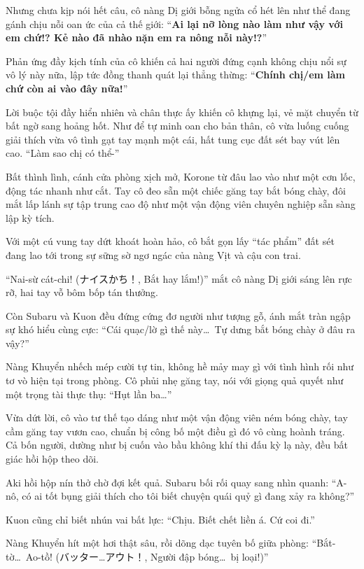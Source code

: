 \documentclass[../main.tex]{subfiles}
\begin{document}
Nhưng chưa kịp nói hết câu, cô nàng Dị giới bỗng ngửa cổ hét lên như thể đang gánh chịu nỗi oan ức của cả thế giới: ``\textbf{Ai lại nỡ lòng nào làm như vậy với em chứ!? Kẻ nào đã nhào nặn em ra nông nỗi này!?}''

Phản ứng đầy kịch tính của cô khiến cả hai người đứng cạnh không chịu nổi sự vô lý này nữa, lập tức đồng thanh quát lại thẳng thừng: ``\textbf{Chính chị/em làm chứ còn ai vào đây nữa!}''

Lời buộc tội đầy hiển nhiên và chân thực ấy khiến cô khựng lại, vẻ mặt chuyển từ bất ngờ sang hoảng hốt. Như để tự minh oan cho bản thân, cô vừa luống cuống giải thích vừa vô tình gạt tay mạnh một cái, hất tung cục đất sét bay vút lên cao. ``Làm sao chị có thể-''

Bất thình lình, cánh cửa phòng xịch mở, Korone từ đâu lao vào như một cơn lốc, động tác nhanh như cắt. Tay cô đeo sẵn một chiếc găng tay bắt bóng chày, đôi mắt lấp lánh sự tập trung cao độ như một vận động viên chuyên nghiệp sẵn sàng lập kỳ tích.

Với một cú vung tay dứt khoát hoàn hảo, cô bắt gọn lấy ``tác phẩm'' đất sét đang lao tới trong sự sững sờ ngơ ngác của nàng Vịt và cậu con trai.


``Nai-sừ cát-chi! (ナイスかち！, Bắt hay lắm!)'' mắt cô nàng Dị giới sáng lên rực rỡ, hai tay vỗ bôm bốp tán thưởng.

Còn Subaru và Kuon đều đứng cứng đơ người như tượng gỗ, ánh mắt tràn ngập sự khó hiểu cùng cực: ``Cái quạc/lờ gì thế này\dots\ Tự dưng bắt bóng chày ở đâu ra vậy?''

Nàng Khuyển nhếch mép cười tự tin, không hề mảy may gì với tình hình rối như tơ vò hiện tại trong phòng. Cô phủi nhẹ găng tay, nói với giọng quả quyết như một trọng tài thực thụ: ``Hụt lần ba\dots''

Vừa dứt lời, cô vào tư thế tạo dáng như một vận động viên ném bóng chày, tay cầm găng tay vươn cao, chuẩn bị công bố một điều gì đó vô cùng hoành tráng. Cả bốn người, dường như bị cuốn vào bầu không khí thi đấu kỳ lạ này, đều bất giác hồi hộp theo dõi.


Aki hồi hộp nín thở chờ đợi kết quả. Subaru bối rối quay sang nhìn quanh: ``A-nô, có ai tốt bụng giải thích cho tôi biết chuyện quái quỷ gì đang xảy ra không?''

Kuon cũng chỉ biết nhún vai bất lực: ``Chịu. Biết chết liền á. Cứ coi đi.''

Nàng Khuyển hít một hơi thật sâu, rồi dõng dạc tuyên bố giữa phòng: ``Bắt-tờ\dots\ Ao-tồ! (バッター…アウト！, Người đập bóng\dots\ bị loại!)''
\end{document}
